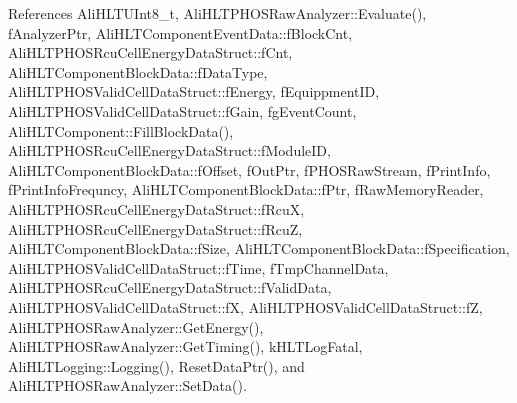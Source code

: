 References Ali\-HLTUInt8\_\-t, Ali\-HLTPHOSRaw\-Analyzer::Evaluate(), f\-Analyzer\-Ptr, Ali\-HLTComponent\-Event\-Data::f\-Block\-Cnt, Ali\-HLTPHOSRcu\-Cell\-Energy\-Data\-Struct::f\-Cnt, Ali\-HLTComponent\-Block\-Data::f\-Data\-Type, Ali\-HLTPHOSValid\-Cell\-Data\-Struct::f\-Energy, f\-Equippment\-ID, Ali\-HLTPHOSValid\-Cell\-Data\-Struct::f\-Gain, fg\-Event\-Count, Ali\-HLTComponent::Fill\-Block\-Data(), Ali\-HLTPHOSRcu\-Cell\-Energy\-Data\-Struct::f\-Module\-ID, Ali\-HLTComponent\-Block\-Data::f\-Offset, f\-Out\-Ptr, f\-PHOSRaw\-Stream, f\-Print\-Info, f\-Print\-Info\-Frequncy, Ali\-HLTComponent\-Block\-Data::f\-Ptr, f\-Raw\-Memory\-Reader, Ali\-HLTPHOSRcu\-Cell\-Energy\-Data\-Struct::f\-Rcu\-X, Ali\-HLTPHOSRcu\-Cell\-Energy\-Data\-Struct::f\-Rcu\-Z, Ali\-HLTComponent\-Block\-Data::f\-Size, Ali\-HLTComponent\-Block\-Data::f\-Specification, Ali\-HLTPHOSValid\-Cell\-Data\-Struct::f\-Time, f\-Tmp\-Channel\-Data, Ali\-HLTPHOSRcu\-Cell\-Energy\-Data\-Struct::f\-Valid\-Data, Ali\-HLTPHOSValid\-Cell\-Data\-Struct::f\-X, Ali\-HLTPHOSValid\-Cell\-Data\-Struct::f\-Z, Ali\-HLTPHOSRaw\-Analyzer::Get\-Energy(), Ali\-HLTPHOSRaw\-Analyzer::Get\-Timing(), k\-HLTLog\-Fatal, Ali\-HLTLogging::Logging(), Reset\-Data\-Ptr(), and Ali\-HLTPHOSRaw\-Analyzer::Set\-Data().

